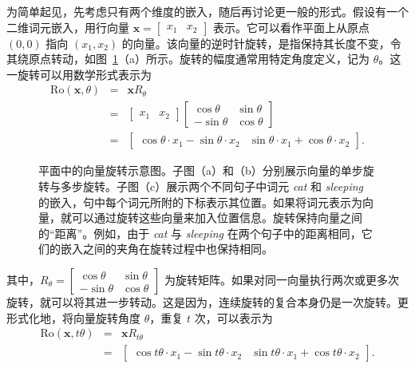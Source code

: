 为简单起见，先考虑只有两个维度的嵌入，随后再讨论更一般的形式。假设有一个二维词元嵌入，用行向量 $\mathbf{x} = \begin{bmatrix} x_1 & x_2 \end{bmatrix}$ 表示。它可以看作平面上从原点 $(0,0)$ 指向 $(x_1, x_2)$ 的向量。该向量的逆时针旋转，是指保持其长度不变，令其绕原点转动，如图~\ref{fig:vector-rotation}（a）所示。旋转的幅度通常用特定角度定义，记为 $\theta$。这一旋转可以用数学形式表示为
\begin{eqnarray}
\mathrm{Ro}(\mathbf{x},\theta) & = & \mathbf{x} R_{\theta} \nonumber \\
                               & = & \begin{bmatrix} x_1 & x_2 \end{bmatrix}
                                     \begin{bmatrix} \cos \theta & \sin \theta \\ -\sin \theta & \cos \theta \end{bmatrix} \nonumber \\
                               & = & \begin{bmatrix} \cos \theta \cdot x_1 - \sin \theta \cdot x_2 & \sin \theta \cdot x_1 + \cos \theta \cdot x_2 \end{bmatrix}.
\end{eqnarray}

\begin{figure}[!t]
\centering

\caption{平面中的向量旋转示意图。子图（a）和（b）分别展示向量的单步旋转与多步旋转。子图（c）展示两个不同句子中词元 \textit{cat} 和 \textit{sleeping} 的嵌入，句中每个词元所附的下标表示其位置。如果将词元表示为向量，就可以通过旋转这些向量来加入位置信息。旋转保持向量之间的“距离”。例如，由于 \textit{cat} 与 \textit{sleeping} 在两个句子中的距离相同，它们的嵌入之间的夹角在旋转过程中也保持相同。}
\label{fig:vector-rotation}
\end{figure}

\noindent 其中，$R_{\theta} = \begin{bmatrix} \cos \theta & \sin \theta \\ -\sin \theta & \cos \theta \end{bmatrix}$ 为旋转矩阵。如果对同一向量执行两次或更多次旋转，就可以将其进一步转动。这是因为，连续旋转的复合本身仍是一次旋转。更形式化地，将向量旋转角度 $\theta$，重复 $t$ 次，可以表示为
\begin{eqnarray}
\mathrm{Ro}(\mathbf{x},t\theta) & = & \mathbf{x} R_{t \theta} \nonumber \\
                                & = & \begin{bmatrix} \cos t \theta \cdot x_1 - \sin t \theta \cdot x_2 & \sin t \theta \cdot x_1 + \cos t \theta \cdot x_2 \end{bmatrix}.
\end{eqnarray}

